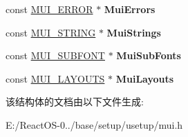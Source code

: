 \begin{DoxyCompactItemize}
const \hyperlink{struct_m_u_i___e_r_r_o_r}{M\+U\+I\+\_\+\+E\+R\+R\+OR} $\ast$ {\bfseries Mui\+Errors}
\item 
\mbox{\label{struct_m_u_i___l_a_n_g_u_a_g_e_a944345c852b0b83990532ceacd4cdf12}} 
const \hyperlink{struct_m_u_i___s_t_r_i_n_g}{M\+U\+I\+\_\+\+S\+T\+R\+I\+NG} $\ast$ {\bfseries Mui\+Strings}
\item 
\mbox{\label{struct_m_u_i___l_a_n_g_u_a_g_e_a23d4ec93e6fa84549c1526d998e56381}} 
const \hyperlink{struct_m_u_i___s_u_b_f_o_n_t}{M\+U\+I\+\_\+\+S\+U\+B\+F\+O\+NT} $\ast$ {\bfseries Mui\+Sub\+Fonts}
\item 
\mbox{\label{struct_m_u_i___l_a_n_g_u_a_g_e_af0583e63891b732d67003a56db36f0e4}} 
const \hyperlink{struct_m_u_i___l_a_y_o_u_t_s}{M\+U\+I\+\_\+\+L\+A\+Y\+O\+U\+TS} $\ast$ {\bfseries Mui\+Layouts}
\end{DoxyCompactItemize}


该结构体的文档由以下文件生成\+:\begin{DoxyCompactItemize}
\item 
E\+:/\+React\+O\+S-\/0../base/setup/usetup/mui.\+h\end{DoxyCompactItemize}
